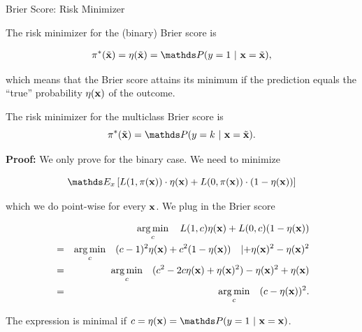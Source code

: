 \documentclass[11pt,compress,t,notes=noshow, xcolor=table]{beamer}
\begin{document}
\begin{vbframe}{Brier Score: Risk Minimizer}

The risk minimizer for the (binary) Brier score is 

\begin{eqnarray*}
\piastxtil = \eta(\xtil) = \P(y=1~|~\xv = \xtil),
\end{eqnarray*}

which means that the Brier score attains its minimum if the prediction equals the \enquote{true} probability $\eta(\mathbf{x})$ of the outcome. 

\lz 

The risk minimizer for the multiclass Brier score is 
$$\piastxtil = \P(y = k ~|~ \xv = \xtil). $$
 
\framebreak
\textbf{Proof: } We only prove for the binary case. We need to minimize 

$$
\E_x \left[L(1, \pix) \cdot \eta(\xv) + L(0, \pix) \cdot (1 - \eta(\xv)) \right]
$$

which we do point-wise for every $\mathbf{x}$. We plug in the Brier score

\vspace*{-0.3cm}

\begin{eqnarray*}
	&& \mathop{\mathrm{arg\,min}}_c \quad L(1, c) \eta(\mathbf{x}) + L(0, c) (1 - \eta(\mathbf{x})) \\ 
	&=&  \mathop{\mathrm{arg\,min}}_c \quad (c - 1)^2 \eta(\mathbf{x}) + c^2 (1 - \eta(\mathbf{x}))  \quad |{+\eta(\mathbf{x})^2-\eta(\mathbf{x})^2}\\
  &=&  \mathop{\mathrm{arg\,min}}_c \quad (c^2 -2c\eta(\mathbf{x}) + \eta(\mathbf{x})^2)- \eta(\mathbf{x})^2 + \eta(\mathbf{x}) \\
	&=&  \mathop{\mathrm{arg\,min}}_c \quad (c - \eta(\mathbf{x}))^2.
\end{eqnarray*}

The expression is minimal if $c = \eta(\xv) = \P(y = 1~|~\xv = \xv)$.

\end{vbframe}
\end{document}
